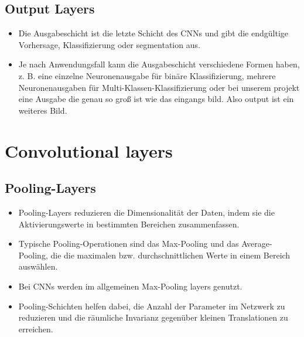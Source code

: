 \subsection{Output Layers}
\begin{itemize}
  \item Die Ausgabeschicht ist die letzte Schicht des CNNs und gibt die endgültige Vorhersage, Klassifizierung oder segmentation aus.
  \item Je nach Anwendungsfall kann die Ausgabeschicht verschiedene Formen haben, z. B. eine einzelne Neuronenausgabe für binäre Klassifizierung, mehrere Neuronenausgaben für Multi-Klassen-Klassifizierung oder bei unserem projekt eine Ausgabe die genau so groß ist wie das eingangs bild. Also output ist ein weiteres Bild.
\end{itemize}

\section{Convolutional layers}

\subsection{Pooling-Layers}
\begin{itemize}
  \item Pooling-Layers reduzieren die Dimensionalität der Daten, indem sie die Aktivierungswerte in bestimmten Bereichen zusammenfassen.
  \item Typische Pooling-Operationen sind das Max-Pooling und das Average-Pooling, die die maximalen bzw. durchschnittlichen Werte in einem Bereich auswählen.
  \item Bei CNNs werden im allgemeinen Max-Pooling layers genutzt.
  \item Pooling-Schichten helfen dabei, die Anzahl der Parameter im Netzwerk zu reduzieren und die räumliche Invarianz gegenüber kleinen Translationen zu erreichen.
\end{itemize}

